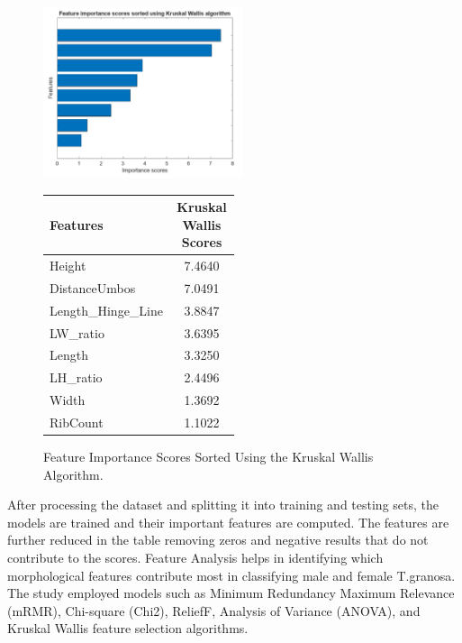 \begin{figure}[!htbp]
	\centering
	\begin{minipage}{0.48\textwidth} 
		\centering
		\includegraphics[width=\textwidth, height=5cm]{figures/kw.png} 
	\end{minipage}%
	\hfill 
	\begin{minipage}{0.48\textwidth} 
		\centering
		{\fontsize{10}{12}\selectfont 
			\begin{tabular}{p{0.5\linewidth}c}
				\hline
				\textbf{Features} & \textbf{Kruskal Wallis Scores}   \\ \hline
				Height              & 7.4640  \\
				DistanceUmbos       & 7.0491  \\
				Length\_Hinge\_Line & 3.8847  \\
				LW\_ratio           & 3.6395  \\
				Length              & 3.3250 \\ 
				LH\_ratio           & 2.4496 \\
				Width               & 1.3692 \\
				RibCount            & 1.1022 \\
				\hline
			\end{tabular}
		}
	\end{minipage}
	\caption{Feature Importance Scores Sorted Using the Kruskal Wallis Algorithm.}
	\label{fig:kw-combined}
\end{figure}

After processing the dataset and splitting it into training and testing sets, the models are trained and their important features are computed. The features are further reduced in the table removing zeros and negative results that do not contribute to the scores. Feature Analysis helps in identifying which morphological features contribute most in classifying male and female T.granosa. The study employed models such as Minimum Redundancy Maximum Relevance (mRMR), Chi-square (Chi2), ReliefF, Analysis of Variance (ANOVA), and Kruskal Wallis feature selection algorithms. 

